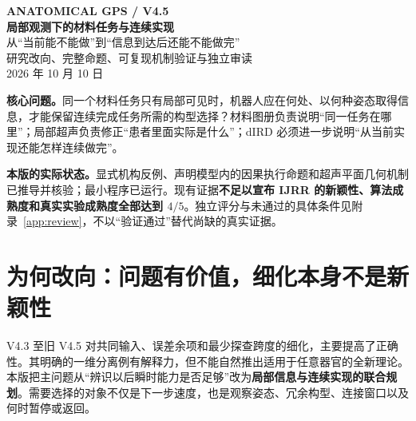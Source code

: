 \documentclass[11pt,a4paper]{article}
\theoremstyle{cn}
\begin{document}
\begin{center}
{\small\color{accent}\bfseries ANATOMICAL GPS \quad / \quad V4.5}\\[0.5em]
{\LARGE\bfseries\color{ink}局部观测下的材料任务与连续实现}\\[0.4em]
{\large 从“当前能不能做”到“信息到达后还能不能做完”}\\[0.7em]
{\small 研究改向、完整命题、可复现机制验证与独立审读}\\
{\small 2026 年 10 月 10 日}
\end{center}

\begin{corebox}
\textbf{核心问题。}同一个材料任务只有局部可见时，机器人应在何处、以何种姿态取得信息，才能保留连续完成任务所需的构型选择？材料图册负责说明“同一任务在哪里”；局部超声负责修正“患者里面实际是什么”；dIRD 必须进一步说明“从当前实现还能怎样连续做完”。

\textbf{本版的实际状态。}显式机构反例、声明模型内的因果执行命题和超声平面几何机制已推导并核验；最小程序已运行。现有证据\textbf{不足以宣布 IJRR 的新颖性、算法成熟度和真实实验成熟度全部达到 \(4/5\)}。独立评分与未通过的具体条件见附录~\ref{app:review}，不以“验证通过”替代尚缺的真实证据。
\end{corebox}

\begin{abstract}
长血管扫描需要把少量示教中的任务规格迁移到新人体，同时沿未知内部目标持续获得局部图像。已知材料位姿可达，甚至具有充足的瞬时 Jacobian 能力，仍不足以保证同一任务能够连续完成：不同冗余实现可能属于不同的后续可执行分量，而区分未知目标的信息可能在最后可切换位置之后才到达。本稿将状态扩展为材料任务地址、数据一致世界、当前连续实现分量及合格扫描覆盖，给出包含全部观测结果的可执行原语接口。显式三轴机构说明局部位姿和能力压缩会遗漏必要状态；有限原语模型说明何种证书足以把因果选择落实为连续输入；倾斜超声子类给出可观测前视距离与必需反扫资源的匹配结果。GP--DMP 仅作为少示教参考与合成先验，局部患者观测、几何误差和机器人验收承担真实执行保证。一般抽象、运动基元学习和冗余路径规划的既有结果均作为工具引用，不重新计为独立新理论。
\end{abstract}

\section{为何改向：问题有价值，细化本身不是新颖性}
\label{sec:change}

V4.3 至旧 V4.5 对共同输入、误差余项和最少探查跨度的细化，主要提高了正确性。其明确的一维分离例有解释力，但不能自然推出适用于任意器官的全新理论。本版把主问题从“辨识以后瞬时能力是否足够”改为\textbf{局部信息与连续实现的联合规划}。需要选择的对象不仅是下一步速度，也是观察姿态、冗余构型、连接窗口以及何时暂停或返回。
\end{document}
